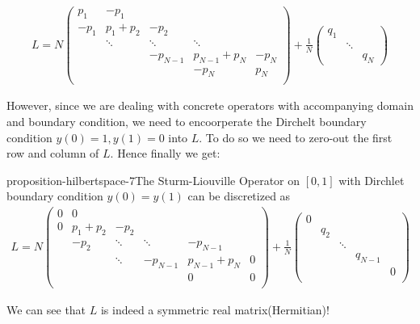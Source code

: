 \begin{equation}
\begin{aligned}
L=N\begin{pmatrix}
p_1&  -p_1 & & &  \\
-p_1& p_1+p_2 &  -p_2 & &  \\
&  \ddots  &  \ddots &   \ddots &   \\
&  &-p_{N-1} &p_{N-1}+p_{N} & -p_N  \\
& & &-p_N & p_N \\
\end{pmatrix} 
+ 
\frac{1}{N}\begin{pmatrix}q_1 & & \\
& \ddots & \\
& & q_N
\end{pmatrix}
\end{aligned}
\end{equation}

However, since we are dealing with concrete operators with accompanying domain and boundary condition, we need to encoorperate the Dirchelt boundary condition $y(0)=1, y(1)=0$ into $L$. To do so we need to zero-out the first row and column of $L$. Hence finally we get:

\begin{mystthmproposition}{}{proposition-hilbertspace-7}The Sturm-Liouville Operator on $[0,1]$ with Dirchlet boundary condition $y(0)=y(1)$ can be discretized as
\begin{equation}
\label{discretesl}
\begin{aligned}
L=N\begin{pmatrix}
0 &0 & & &  &\\
0 &p_1+p_2 & -p_2& & & \\
&-p_2&  \ddots &\ddots & -p_{N-1}& \\
& & \ddots &-p_{N-1} & p_{N-1}+p_N &0 \\
& & & &0 & 0\\
\end{pmatrix} 
+ 
\frac{1}{N}\begin{pmatrix}0 & & & & \\
& q_2 & & & \\
&  & \ddots& & \\
& & & q_{N-1} & \\
& &  & & 0  \\
\end{pmatrix}
\end{aligned}
\end{equation}

\end{mystthmproposition}
We can see that $L$ is indeed a symmetric real matrix(Hermitian)!

